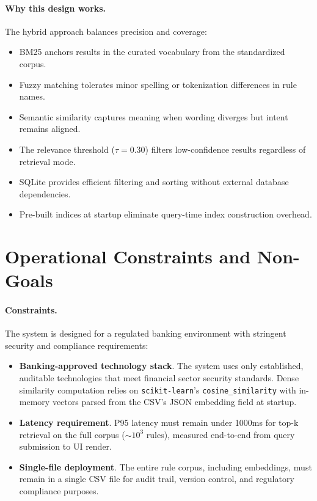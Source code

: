 \paragraph{Why this design works.} 
The hybrid approach balances precision and coverage:
\begin{itemize}[leftmargin=*,itemsep=2pt,topsep=2pt]
 \item BM25 anchors results in the curated vocabulary from the standardized corpus.
 \item Fuzzy matching tolerates minor spelling or tokenization differences in rule names.
 \item Semantic similarity captures meaning when wording diverges but intent remains aligned.
 \item The relevance threshold ($\tau=0.30$) filters low-confidence results regardless of retrieval mode.
 \item SQLite provides efficient filtering and sorting without external database dependencies.
 \item Pre-built indices at startup eliminate query-time index construction overhead.
\end{itemize}

\section{Operational Constraints and Non-Goals}
\paragraph{Constraints.} The system is designed for a regulated banking environment with stringent security and compliance requirements:
\begin{itemize}[leftmargin=*,itemsep=2pt,topsep=2pt]
 \item \textbf{Banking-approved technology stack}. The system uses only established, auditable technologies that meet financial sector security standards. Dense similarity computation relies on \texttt{scikit-learn}'s \texttt{cosine\_similarity} \cite{pedregosa2011sklearn} with in-memory vectors parsed from the CSV's JSON embedding field at startup.
 \item \textbf{Latency requirement}. P95 latency must remain under 1000ms for top-k retrieval on the full corpus (${\sim}10^3$ rules), measured end-to-end from query submission to UI render.
 \item \textbf{Single-file deployment}. The entire rule corpus, including embeddings, must remain in a single CSV file for audit trail, version control, and regulatory compliance purposes.
\end{itemize}
